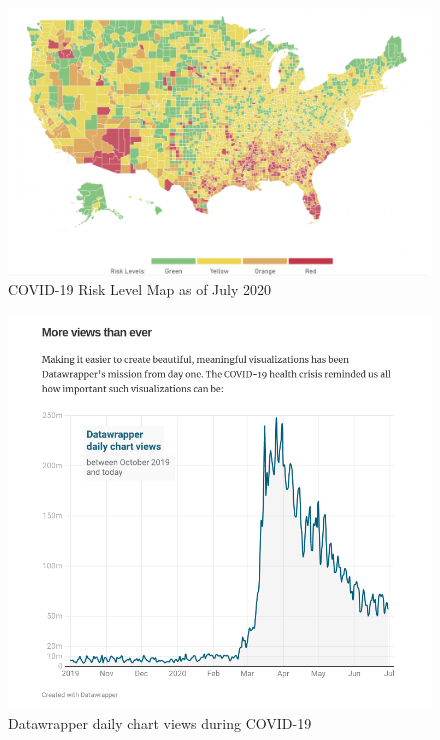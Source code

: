 \documentclass[print]{nuthesis}
\begin{document}
\begin{figure}[tbp]

{\centering \includegraphics[width=1\linewidth,]{images/covid19-summer2020-risk-map} 

}

\caption{COVID-19 Risk Level Map as of July 2020}\label{fig:covid19-summer2020-risk-map}
\end{figure}

\begin{figure}[tbp]

{\centering \includegraphics[width=1\linewidth,]{images/covid19-datawrapper-views-july2020} 

}

\caption{Datawrapper daily chart views during COVID-19}\label{fig:covid19-datawrapper-views-july2020}
\end{figure}
\end{document}
